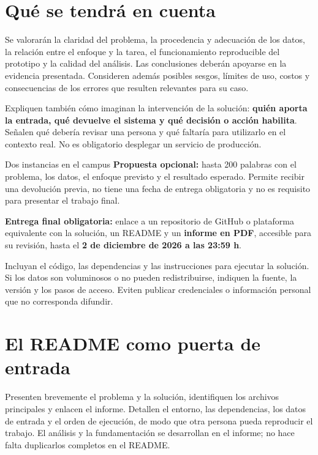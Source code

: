 \documentclass[11pt,a4paper]{article}
\begin{document}
\section*{Qué se tendrá en cuenta}
Se valorarán la claridad del problema, la procedencia y adecuación de los datos, la relación entre el enfoque y la tarea, el funcionamiento reproducible del prototipo y la calidad del análisis. Las conclusiones deberán apoyarse en la evidencia presentada. Consideren además posibles sesgos, límites de uso, costos y consecuencias de los errores que resulten relevantes para su caso.

Expliquen también cómo imaginan la intervención de la solución: \textbf{quién aporta la entrada, qué devuelve el sistema y qué decisión o acción habilita}. Señalen qué debería revisar una persona y qué faltaría para utilizarlo en el contexto real. No es obligatorio desplegar un servicio de producción.

\newpage
{}

\begin{destacado}{Dos instancias en el campus}
\textbf{Propuesta opcional:} hasta 200 palabras con el problema, los datos, el enfoque previsto y el resultado esperado. Permite recibir una devolución previa, no tiene una fecha de entrega obligatoria y no es requisito para presentar el trabajo final.

\textbf{Entrega final obligatoria:} enlace a un repositorio de GitHub o plataforma equivalente con la solución, un README y un \textbf{informe en PDF}, accesible para su revisión, hasta el \textbf{2 de diciembre de 2026 a las 23:59 h}.
\end{destacado}

Incluyan el código, las dependencias y las instrucciones para ejecutar la solución. Si los datos son voluminosos o no pueden redistribuirse, indiquen la fuente, la versión y los pasos de acceso. Eviten publicar credenciales o información personal que no corresponda difundir.

\section*{El README como puerta de entrada}
Presenten brevemente el problema y la solución, identifiquen los archivos principales y enlacen el informe. Detallen el entorno, las dependencias, los datos de entrada y el orden de ejecución, de modo que otra persona pueda reproducir el trabajo. El análisis y la fundamentación se desarrollan en el informe; no hace falta duplicarlos completos en el README.
\end{document}
